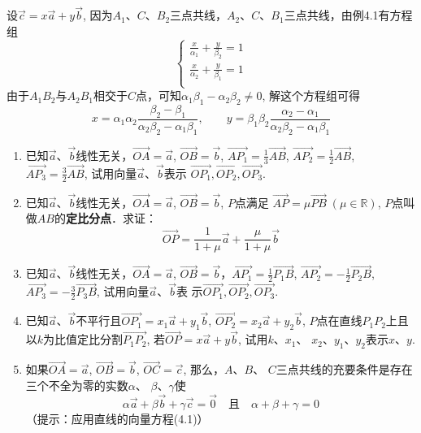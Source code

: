 \begin{solution}
    设$\vec{c}=x\vec{a}+y\vec{b}$, 因为$A_1$、$C$、$B_2$三点共线，$A_2$、$C$、$B_1$三点共线，由例4.1有方程组
\[\begin{cases}
    \frac{x}{\alpha_1}+\frac{y}{\beta_2}=1\\
    \frac{x}{\alpha_2}+\frac{y}{\beta_1}=1\\
\end{cases}\]
由于$A_1B_2$与$A_2B_1$相交于$C$点，可知$\alpha_1\beta_1-\alpha_2\beta_2\ne 0$, 解这个方程组可得
\[x=\alpha_1\alpha_2\frac{\beta_2-\beta_1}{\alpha_2\beta_2-\alpha_1\beta_1},\qquad y=\beta_1\beta_2\frac{\alpha_2-\alpha_1}{\alpha_2\beta_2-\alpha_1\beta_1}\]
\end{solution}

\begin{ex}
\begin{enumerate}
    \item 已知$\vec{a}$、$\vec{b}$线性无关，$\Vec{OA}=\vec{a}$, $\Vec{OB}=\vec{b}$, $\Vec{AP_1}=\frac{1}{3}\Vec{AB}$,
    $\Vec{AP_2}=\frac{1}{2}\Vec{AB}$, $\Vec{AP_3}=\frac{3}{2}\Vec{AB}$,
    试用向量$\vec{a}$、$\vec{b}$表示
    $\Vec{OP_1},\Vec{OP_2},\Vec{OP_3}$.

    \item 已知$\vec{a}$、$\vec{b}$线性无关，$\Vec{OA}=\vec{a}$, $\Vec{OB}=\vec{b}$, $P$点满足
    $\Vec{AP}=\mu \Vec{PB}\;  (\mu\in\mathbb{R})$, $P$点叫做$AB$的\textbf{定比分点}．求证：
\[\Vec{OP}=\frac{1}{1+\mu}\vec{a}+\frac{\mu}{1+\mu}\vec{b}\]
    \item 已知$\vec{a}$、$\vec{b}$线性无关，$\Vec{OA}=\vec{a}$, $\Vec{OB}=\vec{b}$，$\Vec{AP_1}=\frac{1}{2}\Vec{P_1B}$,
    $\Vec{AP_2}=-\frac{1}{2}\Vec{P_2B}$, $\Vec{AP_3}=-\frac{3}{2}\Vec{P_3B}$, 
    试用向量$\vec{a}$、$\vec{b}$表
    示$\Vec{OP_1},\Vec{OP_2},\Vec{OP_3}$.
    \item 已知$\vec{a}$、$\vec{b}$不平行且$\Vec{OP_1}=
    x_1\vec{a}+y_1\vec{b}$, $\Vec{OP_2}=x_2\vec{a}+y_2\vec{b}$, 
    $P$点在直线$P_1P_2$上且以$k$为比值定比分割$\Vec{P_1P_2}$,
    若$\Vec{OP}=x\vec{a}+y\vec{b}$, 
    试用$k$、$x_1$、
    $x_2$、$y_1$、$y_2$表示$x$、$y$.
    \item 如果$\Vec{OA}=\vec{a}$, $\Vec{OB}=\vec{b}$, $\Vec{OC}=\vec{c}$, 那么，$A$、$B$、
    $C$三点共线的充要条件是存在三个不全为零的实数$\alpha$、
    $\beta$、$\gamma$使
  \[  \alpha\vec{a}+\beta\vec{b}+\gamma\vec{c}=\vec{0}\quad \text{且}\quad \alpha+\beta+\gamma=0\]
    （提示：应用直线的向量方程(4.1)）
\end{enumerate}
\end{ex}

